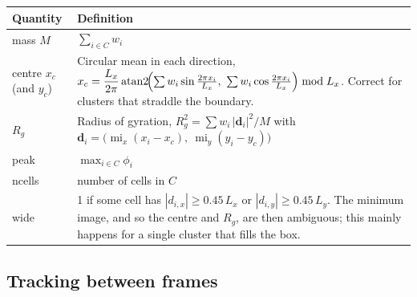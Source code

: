 \documentclass[11pt]{article}
\begin{document}
\begin{center}
\begin{tabularx}{\textwidth}{@{}lL@{}}
\toprule
Quantity & Definition \\
\midrule
mass $M$ & $\sum_{i\in C} w_i$ \\
centre $x_c$ (and $y_c$) &
  Circular mean in each direction,
  $x_c = \dfrac{L_x}{2\pi}\operatorname{atan2}\!\Bigl(\sum w_i\sin\tfrac{2\pi x_i}{L_x},\
  \sum w_i\cos\tfrac{2\pi x_i}{L_x}\Bigr) \bmod L_x$. Correct for clusters that
  straddle the boundary. \\
$R_g$ & Radius of gyration,
  $R_g^2 = \sum w_i\,|\mathbf{d}_i|^2/M$ with
  $\mathbf{d}_i = \bigl(\operatorname{mi}_x(x_i - x_c),\ \operatorname{mi}_y(y_i - y_c)\bigr)$ \\
peak & $\max_{i\in C}\phi_i$ \\
ncells & number of cells in $C$ \\
wide & 1 if some cell has $|d_{i,x}| \ge 0.45\,L_x$ or $|d_{i,y}| \ge 0.45\,L_y$.
  The minimum image, and so the centre and $R_g$, are then ambiguous; this
  mainly happens for a single cluster that fills the box. \\
\bottomrule
\end{tabularx}
\end{center}

\subsection{Tracking between frames}
\end{document}
